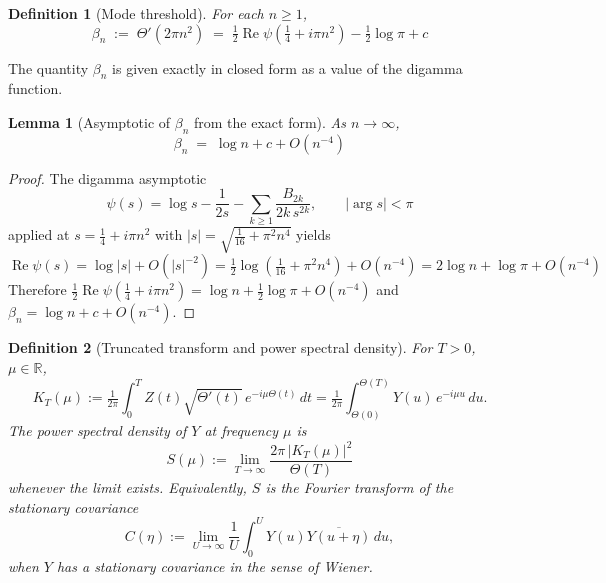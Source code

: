 \documentclass[11pt]{article}
\newtheorem{lemma}{Lemma}
\newtheorem{definition}{Definition}
\DeclareMathOperator{\ReOp}{Re}
\let\Re\ReOp
\begin{document}
\begin{definition}[Mode threshold]\label{def:betan}
For each $n\ge 1$,
\begin{equation}\label{eq:betan}
\beta_n \;:=\; \Theta'(2\pi n^2) \;=\; \tfrac{1}{2}\Re\psi\!\left(\tfrac{1}{4}+i\pi n^2\right) - \tfrac{1}{2}\log\pi + c
\end{equation}
\end{definition}

The quantity $\beta_n$ is given exactly in closed form as a value of the digamma function.

\begin{lemma}[Asymptotic of $\beta_n$ from the exact form]\label{lem:betaasymp}
As $n\to\infty$,
\begin{equation}\label{eq:betaasymp}
\beta_n \;=\; \log n + c + O(n^{-4})
\end{equation}
\end{lemma}

\begin{proof}
The digamma asymptotic
\begin{equation}\label{eq:digasymp}
\psi(s) = \log s - \frac{1}{2s} - \sum_{k\ge 1}\frac{B_{2k}}{2k\,s^{2k}},\qquad |\arg s|<\pi
\end{equation}
applied at $s=\tfrac{1}{4}+i\pi n^2$ with $|s|=\sqrt{\tfrac{1}{16}+\pi^2 n^4}$ yields
\begin{equation}\label{eq:Repsi-asymp}
\Re\psi(s) = \log|s| + O(|s|^{-2}) = \tfrac{1}{2}\log(\tfrac{1}{16}+\pi^2 n^4) + O(n^{-4}) = 2\log n + \log\pi + O(n^{-4})
\end{equation}
Therefore $\tfrac{1}{2}\Re\psi(\tfrac{1}{4}+i\pi n^2) = \log n + \tfrac{1}{2}\log\pi + O(n^{-4})$ and $\beta_n = \log n + c + O(n^{-4})$.
\end{proof}

\begin{definition}[Truncated transform and power spectral density]\label{def:KT}
For $T>0$, $\mu\in\mathbb{R}$,
\begin{equation}\label{eq:KT}
K_T(\mu) := \tfrac{1}{2\pi}\int_{0}^{T}Z(t)\sqrt{\Theta'(t)}\,e^{-i\mu\Theta(t)}\,dt = \tfrac{1}{2\pi}\int_{\Theta(0)}^{\Theta(T)}Y(u)\,e^{-i\mu u}\,du.
\end{equation}
The \emph{power spectral density} of $Y$ at frequency $\mu$ is
\begin{equation}\label{eq:PSDdef}
S(\mu) := \lim_{T\to\infty}\frac{2\pi\,|K_T(\mu)|^2}{\Theta(T)}
\end{equation}
whenever the limit exists. Equivalently, $S$ is the Fourier transform of the stationary covariance
\begin{equation}\label{eq:Cdef}
C(\eta) := \lim_{U\to\infty}\frac{1}{U}\int_0^U Y(u)\overline{Y(u+\eta)}\,du,
\end{equation}
when $Y$ has a stationary covariance in the sense of Wiener.
\end{definition}
\end{document}
